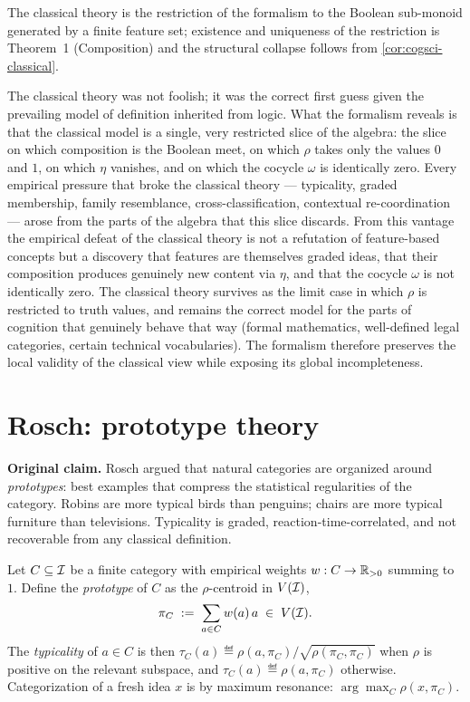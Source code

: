 \formalstatus The classical theory is the restriction of the formalism to
the Boolean sub-monoid generated by a finite feature set; existence and
uniqueness of the restriction is Theorem~1 (Composition) and the structural
collapse follows from \cref{cor:cogsci-classical}.

\litcomment The classical theory was not foolish; it was the correct first
guess given the prevailing model of definition inherited from logic. What
the formalism reveals is that the classical model is a single, very
restricted slice of the algebra: the slice on which composition is the
Boolean meet, on which $\rho$ takes only the values $0$ and $1$, on which
$\eta$ vanishes, and on which the cocycle $\omega$ is identically zero.
Every empirical pressure that broke the classical theory --- typicality,
graded membership, family resemblance, cross-classification, contextual
re-coordination --- arose from the parts of the algebra that this slice
discards. From this vantage the empirical defeat of the classical theory
is not a refutation of feature-based concepts but a discovery that
features are themselves graded ideas, that their composition produces
genuinely new content via $\eta$, and that the cocycle $\omega$ is not
identically zero. The classical theory survives as the limit case in
which $\rho$ is restricted to truth values, and remains the correct model
for the parts of cognition that genuinely behave that way (formal
mathematics, well-defined legal categories, certain technical
vocabularies). The formalism therefore preserves the local validity of
the classical view while exposing its global incompleteness.

\section{Rosch: prototype theory}\label{sec:cogsci-rosch}

\textbf{Original claim.} Rosch \citep{Rosch1973,RoschMervis1975} argued
that natural categories are organized around \emph{prototypes}: best
examples that compress the statistical regularities of the category. Robins
are more typical birds than penguins; chairs are more typical furniture
than televisions. Typicality is graded, reaction-time-correlated, and not
recoverable from any classical definition.

\formalclaim Let $C\subseteq\mathcal{I}$ be a finite category with empirical
weights $w:C\to\mathbb{R}_{>0}$ summing to $1$. Define the \emph{prototype} of
$C$ as the $\rho$-centroid in $V(\mathcal{I})$,
\[
  \pi_C \;\mathrel{:=}\; \sum_{a\in C} w(a)\,a \;\in\; V(\mathcal{I}).
\]
The \emph{typicality} of $a\in C$ is then
$\tau_C(a)\eqdef\rho(a,\pi_C)/\sqrt{\rho(\pi_C,\pi_C)}$ when $\rho$ is
positive on the relevant subspace, and $\tau_C(a)\eqdef\rho(a,\pi_C)$
otherwise. Categorization of a fresh idea $x$ is by maximum resonance:
$\arg\max_{C}\rho(x,\pi_C)$.

